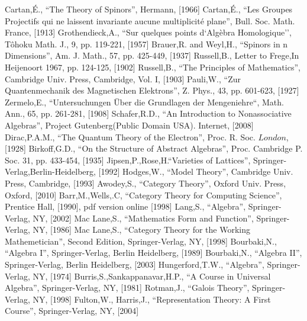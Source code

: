 \documentclass[aps,twocolumn,secnumarabic,nobalancelastpage,amsmath,amssymb,
amsthm,nofootinbib,parskip=full]{revtex4}
\numberwithin{equation}{section}
\begin{document}

\begin{thebibliography}{99}
Cartan,\'{E}., ``The Theory of Spinors'', Hermann, [1966]
Cartan,\'{E}., ``Les Groupes Projectifs qui ne laissent
  invariante aucune multiplicit\'{e} plane'', Bull. Soc. Math. France, [1913]
Grothendieck,A., ``Sur quelques points d`Alg\`{e}bra Homologique'', T\^{o}hoku Math. J., 9, pp. 119-221, [1957]
Brauer,R. and Weyl,H., ``Spinors in n Dimensions'', Am. J. Math., 57, pp. 425-449, [1937]
Russell,B., Letter to Frege,In Heijenoort 1967, pp. 124-125, [1902]
Russell,B., ``The Principles of Mathematics'', Cambridge Univ. Press, Cambridge, Vol. I, [1903]
Pauli,W., ``Zur Quantenmechanik des Magnetischen Elektrons'', Z. Phys., 43, pp. 601-623, [1927]
Zermelo,E., ``Untersuchungen \"{U}ber die Grundlagen der Mengeniehre``, Math. Ann., 65, pp. 261-281, [1908]
Schafer,R.D., ``An Introduction to Nonassociative Algebras'', Project Gutenberg(Public Domain USA). Internet, [2008]
Dirac,P.A.M., ``The Quantum Theory of the Electron'', Proc. R. Soc. \(London\), [1928]
Birkoff,G.D., ``On the Structure of Abstract Algebras'', Proc. Cambridge P. Soc. 31, pp. 433-454, [1935]
Jipsen,P.,Rose,H.``Varieties of Lattices'', Springer-Verlag,Berlin-Heidelberg, [1992]
Hodges,W., ``Model Theory'', Cambridge Univ. Press, Cambridge, [1993]
Awodey,S., ``Category Theory'', Oxford Univ. Press, Oxford, [2010]
Barr,M.,Wells,.C, ``Category Theory for Computing Science'', Prentice Hall, [1990], pdf version online [1998]
Lang,S., ``Algebra'', Springer-Verlag, NY, [2002]
Mac Lane,S., ``Mathematics Form and Function'', Springer-Verlag, NY, [1986]
Mac Lane,S., ``Category Theory for the Working Mathemetician'', Second Edition, Springer-Verlag, NY, [1998]
Bourbaki,N., ``Algebra I'', Springer-Verlag, Berlin Heidelberg, [1989]
Bourbaki,N., ``Algebra II'', Springer-Verlag, Berlin Heidelberg, [2003]
Hungerford,T.W., ``Algebra'', Springer-Verlag, NY, [1974]
Burris,S.,Sankappanavar,H.P., ``A Course in Universal Algebra'', Springer-Verlag, NY, [1981]
Rotman,J., ``Galois Theory'', Springer-Verlag, NY, [1998]
Fulton,W., Harris,J., ``Representation Theory: A First Course'', Springer-Verlag, NY, [2004]

\end{thebibliography}
\end{document}
